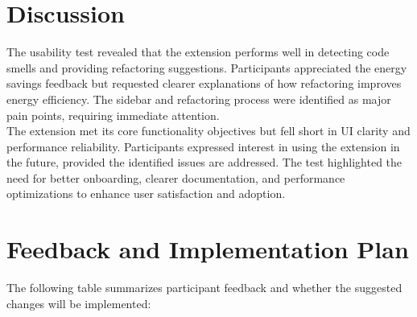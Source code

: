 \documentclass[12pt, titlepage]{article}
\begin{document}
\section*{Discussion}
The usability test revealed that the extension performs well in
detecting code smells and providing refactoring suggestions.
Participants appreciated the energy savings feedback but requested
clearer explanations of how refactoring improves energy efficiency.
The sidebar and refactoring process were identified as major pain
points, requiring immediate attention.\\

The extension met its core functionality objectives but fell short in
UI clarity and performance reliability. Participants expressed
interest in using the extension in the future, provided the
identified issues are addressed. The test highlighted the need for
better onboarding, clearer documentation, and performance
optimizations to enhance user satisfaction and adoption.

\section*{Feedback and Implementation Plan}
The following table summarizes participant feedback and whether the
suggested changes will be implemented:
\end{document}
